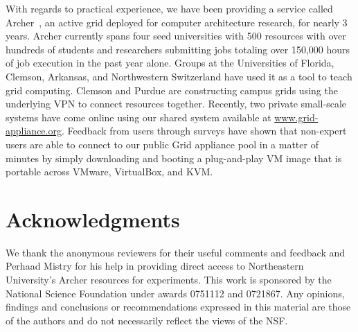 \documentclass[conference]{IEEEtran}
\begin{document}
With regards to practical experience, we have been providing a service called
Archer~\cite{archer}, an active grid deployed for computer architecture
research, for nearly 3 years.  Archer currently spans four seed universities
with 500 resources with over hundreds of students and researchers submitting
jobs totaling over 150,000 hours of job execution in the past year alone.
Groups at the Universities of Florida, Clemson, Arkansas, and Northwestern
Switzerland have used it as a tool to teach grid computing.  Clemson and Purdue
are constructing campus grids using the underlying VPN to connect resources
together.  Recently, two private small-scale systems have come online using our
shared system available at \url{www.grid-appliance.org}.  Feedback from users
through surveys have shown that non-expert users are able to connect to our
public Grid appliance pool in a matter of minutes by simply downloading and
booting a plug-and-play VM image that is portable across VMware, VirtualBox,
and KVM.

\section*{Acknowledgments}

We thank the anonymous reviewers for their useful comments and feedback and
Perhaad Mistry for his help in providing direct access to Northeastern
University's Archer resources for experiments.  This work is sponsored by the
National Science Foundation under awards 0751112 and 0721867.  Any opinions,
findings and conclusions or recommendations expressed in this material are
those of the authors and do not necessarily reflect the views of the NSF.



\end{document}
